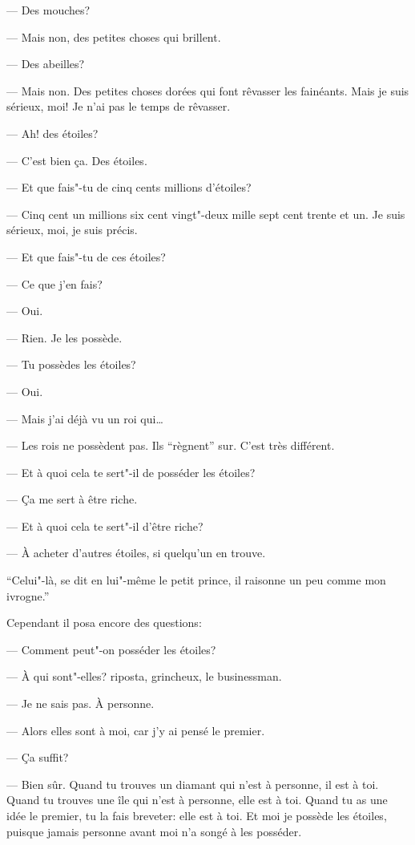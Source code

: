 \begin{Parallel}[p]{}{}
{--- Des mouches?

--- Mais non, des petites choses qui brillent.

--- Des abeilles?

--- Mais non. Des petites choses dorées qui font rêvasser les fainéants. Mais je suis sérieux, moi! Je
n'ai pas le temps de rêvasser.

--- Ah! des étoiles?

--- C'est bien ça. Des étoiles.

--- Et que fais"-tu de cinq cents millions d'étoiles?

--- Cinq cent un millions six cent vingt"-deux mille
sept cent trente et un. Je suis sérieux, moi, je suis
précis.

--- Et que fais"-tu de ces étoiles?

--- Ce que j'en fais?

--- Oui.

--- Rien. Je les possède.

--- Tu possèdes les étoiles?

--- Oui.

--- Mais j'ai déjà vu un roi qui\ldots{}

--- Les rois ne possèdent pas. Ils ``règnent'' sur. C'est très différent.

--- Et à quoi cela te sert"-il de posséder les étoiles?

--- Ça me sert à être riche.

--- Et à quoi cela te sert"-il d'être riche?

--- À acheter d'autres étoiles, si quelqu'un en trouve.

``Celui"-là, se dit en lui"-même le petit prince, il raisonne un peu comme mon ivrogne.''

Cependant il posa encore des questions:

--- Comment peut"-on posséder les étoiles?

--- À qui sont"-elles? riposta, grincheux, le businessman.

--- Je ne sais pas. À personne.

--- Alors elles sont à moi, car j'y ai pensé le premier.

--- Ça suffit?

--- Bien sûr. Quand tu trouves un diamant qui
n'est à personne, il est à toi. Quand tu trouves une
île qui n'est à personne, elle est à toi. Quand tu as
une idée le premier, tu la fais breveter: elle est à toi.
Et moi je possède les étoiles, puisque jamais personne avant moi n'a songé à les posséder.

}
\end{Parallel}
